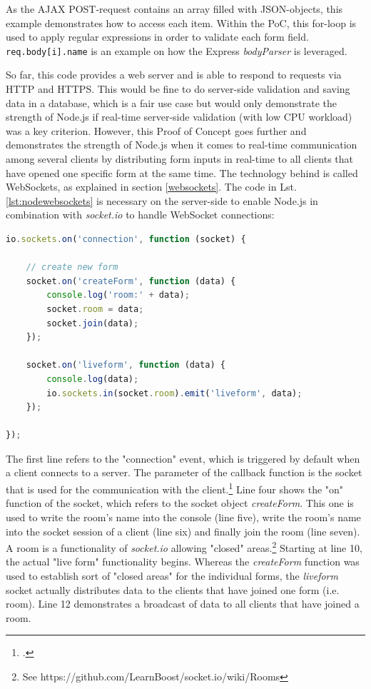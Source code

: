 As the AJAX POST-request contains an array filled with JSON-objects, this
example demonstrates how to access each item. Within the PoC, this
for-loop is used to apply regular expressions in order to validate each form
field. \texttt{req.body[i].name} is an example on how the Express \textit{bodyParser} is leveraged.

So far, this code provides a web server and is able to respond to requests via HTTP and HTTPS. This would be fine to do server-side validation and saving data in a database, which is a fair use case but would only demonstrate the strength of Node.js if real-time server-side validation (with low CPU workload) was a key criterion. However, this Proof of Concept goes further and demonstrates the strength of Node.js when it comes to real-time communication among several clients by distributing form inputs in real-time to all clients that have opened one specific form at the same time. The technology behind is called WebSockets, as explained in section \ref{websockets}. The code in Lst.  \ref{lst:nodewebsockets} is necessary on the server-side to enable Node.js in combination with \textit{socket.io} to handle WebSocket connections:

\begin{lstlisting}[float,
language=javascript,
caption={Using WebSockets to distribute form inputs in real-time},
label=lst:nodewebsockets]
io.sockets.on('connection', function (socket) {

    // create new form
    socket.on('createForm', function (data) {
        console.log('room:' + data);
        socket.room = data;
        socket.join(data);
    });

    socket.on('liveform', function (data) {
        console.log(data);
        io.sockets.in(socket.room).emit('liveform', data);
    });

});
\end{lstlisting}

The first line refers to the "connection" event, which is triggered by default when a client connects to a server. The parameter of the callback function is the socket that is used for the communication with the client.\footcite[Cf.][197]{Roden_2012} Line four shows the "on" function of the socket, which refers to the socket object \textit{createForm}. This one is used to write the room's name into the console (line five), write the room's name into the socket session of a client (line six) and finally join the room (line seven). A room is a functionality of \textit{socket.io} allowing "closed" areas.\footnote{See https://github.com/LearnBoost/socket.io/wiki/Rooms} Starting at line 10, the actual "live form" functionality begins. Whereas the \textit{createForm} function was used to establish sort of "closed areas" for the individual forms, the \textit{liveform} socket actually distributes data to the clients that have joined one form (i.e. room). Line 12 demonstrates a broadcast of data to all clients that have joined a room.

